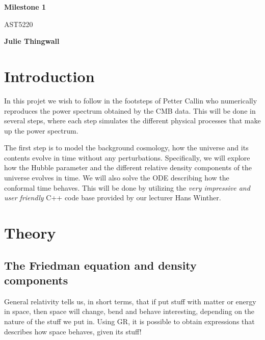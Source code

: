 \documentclass[12pt]{article}
\begin{document}
    \begin{titlepage}
        \begin{center}
            \vspace*{5cm}
            
            \Huge
            \textbf{Milestone 1}
            
            \vspace*{0.5cm}
            \LARGE
            AST5220
        
            \vspace*{0.5cm}
        
            \textbf{Julie Thingwall}
        \end{center}
    \end{titlepage}

\section{Introduction}
    In this projet we wish to follow in the footsteps of Petter Callin\cite{callin2006calculate} who numerically reproduces the power spectrum obtained by the CMB data. This will be done in several steps, where each step simulates the different physical processes that make up the power spectrum.
    
    The first step is to model the background cosmology, how the universe and its contents evolve in time without any perturbations. Specifically, we will explore how the Hubble parameter and the different relative density components of the universe evolves in time. We will also solve the ODE describing how the conformal time behaves. This will be done by utilizing the \textit{very impressive and user friendly} C++ code base provided by our lecturer Hans Winther.



\section{Theory}
\subsection{The Friedman equation and density components}
General relativity tells us, in short terms, that if put stuff with matter or energy in space, then space will change, bend and behave interesting, depending on the nature of the stuff we put in. Using GR, it is possible to obtain expressions that describes how space behaves, given its stuff! 
\end{document}
